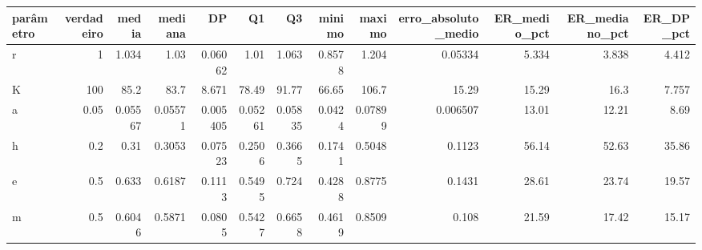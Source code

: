 \begin{tabular}{lrrrrrrrrrrrr}
\toprule
parâmetro & verdadeiro & media & mediana & DP & Q1 & Q3 & minimo & maximo & erro\_absoluto\_medio & ER\_medio\_pct & ER\_mediano\_pct & ER\_DP\_pct \\
\midrule
r & 1 & 1.034 & 1.03 & 0.06062 & 1.01 & 1.063 & 0.8578 & 1.204 & 0.05334 & 5.334 & 3.838 & 4.412 \\
K & 100 & 85.2 & 83.7 & 8.671 & 78.49 & 91.77 & 66.65 & 106.7 & 15.29 & 15.29 & 16.3 & 7.757 \\
a & 0.05 & 0.05567 & 0.05571 & 0.005405 & 0.05261 & 0.05835 & 0.0424 & 0.07899 & 0.006507 & 13.01 & 12.21 & 8.69 \\
h & 0.2 & 0.31 & 0.3053 & 0.07523 & 0.2506 & 0.3665 & 0.1741 & 0.5048 & 0.1123 & 56.14 & 52.63 & 35.86 \\
e & 0.5 & 0.633 & 0.6187 & 0.1113 & 0.5495 & 0.724 & 0.4288 & 0.8775 & 0.1431 & 28.61 & 23.74 & 19.57 \\
m & 0.5 & 0.6046 & 0.5871 & 0.0805 & 0.5427 & 0.6658 & 0.4619 & 0.8509 & 0.108 & 21.59 & 17.42 & 15.17 \\
\bottomrule
\end{tabular}
